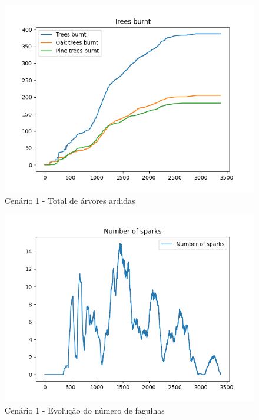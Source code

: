 \begin{figure}[H]
    \centering
    \includegraphics[width=\linewidth]{../src/runs/scenario1/trees_burnt}
    \caption{Cenário 1 - Total de árvores ardidas}
    \label{fig:S1TreesBurnt}
\end{figure}

\begin{figure}[H]
    \centering
    \includegraphics[width=\textwidth]{../src/runs/scenario1/sparks}
    \caption{Cenário 1 - Evolução do número de fagulhas}
    \label{fig:S1Sparks}
\end{figure}

